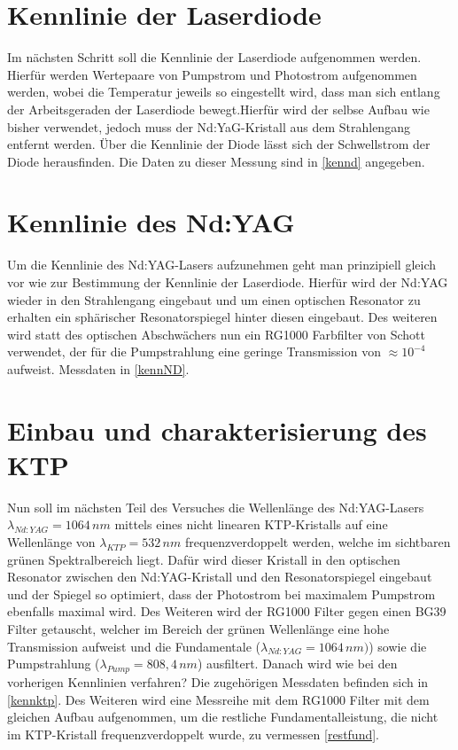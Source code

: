 \documentclass[twoside,colorback,accentcolor=tud4c,11pt]{tudreport}
\begin{document}
\section{Kennlinie der Laserdiode}\label{v3}
Im nächsten Schritt soll die Kennlinie der Laserdiode aufgenommen werden. Hierfür werden Wertepaare von Pumpstrom und Photostrom aufgenommen werden, wobei die Temperatur jeweils so eingestellt wird, dass man sich entlang der Arbeitsgeraden der Laserdiode bewegt.Hierfür wird der selbse Aufbau wie bisher verwendet, jedoch muss der Nd:YaG-Kristall aus dem Strahlengang entfernt werden. Über die Kennlinie der Diode lässt sich der Schwellstrom der Diode herausfinden. Die Daten zu dieser Messung sind in \ref{kennd} angegeben.
\section{Kennlinie des Nd:YAG}\label{v4}
Um die Kennlinie des Nd:YAG-Lasers aufzunehmen geht man prinzipiell gleich vor wie zur Bestimmung der Kennlinie der Laserdiode. Hierfür wird der Nd:YAG wieder in den Strahlengang eingebaut und um einen optischen Resonator zu erhalten ein sphärischer Resonatorspiegel hinter diesen eingebaut. Des weiteren wird statt des optischen Abschwächers nun ein RG1000 Farbfilter von Schott verwendet, der für die Pumpstrahlung eine geringe Transmission von $\approx 10^{-4}$ aufweist. Messdaten in \ref{kennND}.
\section{Einbau und charakterisierung des KTP}\label{v5}
Nun soll im nächsten Teil des Versuches die Wellenlänge des Nd:YAG-Lasers $\lambda_{Nd:YAG}=1064\,\si{nm}$ mittels eines nicht linearen KTP-Kristalls auf eine Wellenlänge von $\lambda_{KTP}=532\,\si{nm}$ frequenzverdoppelt werden, welche im sichtbaren grünen Spektralbereich liegt. Dafür wird dieser Kristall in den optischen Resonator zwischen den Nd:YAG-Kristall und den Resonatorspiegel eingebaut und der Spiegel so optimiert, dass der Photostrom bei maximalem Pumpstrom ebenfalls maximal wird. Des Weiteren wird der RG1000 Filter gegen einen BG39 Filter getauscht, welcher im Bereich der grünen Wellenlänge eine hohe Transmission aufweist und die Fundamentale ($\lambda_{Nd:YAG}=1064\,\si{nm})$) sowie die Pumpstrahlung ($\lambda_{Pump}=808,4\,\si{nm}$) ausfiltert. Danach wird wie bei den vorherigen Kennlinien verfahren? Die zugehörigen Messdaten befinden sich in \ref{kennktp}.
Des Weiteren wird eine Messreihe mit dem RG1000 Filter mit dem gleichen Aufbau aufgenommen, um die restliche Fundamentalleistung, die nicht im KTP-Kristall frequenzverdoppelt wurde, zu vermessen \ref{restfund}.
\end{document}
